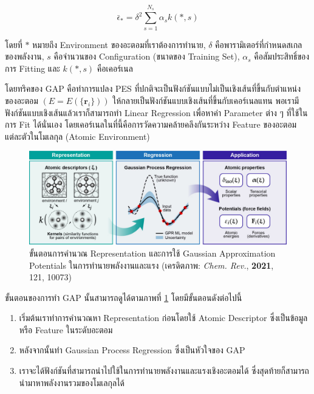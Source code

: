\begin{equation}\label{eq:gap}
    \bar{\epsilon}_{\ast} 
    = 
    \delta^{2} \sum\limits_{s = 1}^{N_s} \alpha_{s} k(\ast,s)
\end{equation}

\noindent โดยที่ $\ast$ หมายถึง Environment ของอะตอมที่เราต้องการทำนาย, $\delta$ คือพารามิเตอร์ที่กำหนดสเกลของพลังงาน, $s$ คือจำนวนของ Configuration (ขนาดของ Training Set), $\alpha_{s}$ คือสัมประสิทธิ์ของการ Fitting และ $k(\ast,s)$ คือเคอร์เนล

โดยทริคของ GAP คือทำการแปลง PES ที่ปกติจะเป็นฟังก์ชันแบบไม่เป็นเชิงเส้นที่ขึ้นกับตำแหน่งของอะตอม $(E = E(\{ \bm{r}_i \}))$ ให้กลายเป็นฟังก์ชันแบบเชิงเส้นที่ขึ้นกับเคอร์เนลแทน พอเรามีฟังก์ชันแบบเชิงเส้นแล้วเราก็สามารถทำ Linear Regression เพื่อหาค่า Parameter ต่าง ๆ ที่ใช้ในการ Fit ได้นั่นเอง โดยเคอร์เนลในที่นี้คือการวัดความคล้ายคลึงกันระหว่าง Feature ของอะตอมแต่ละตัวในโมเลกุล (Atomic Environment)

\begin{figure}[H]
    \centering
    \includegraphics[width=\linewidth]{fig/gap_procedure.jpeg}
    \caption{ขั้นตอนการคำนวณ Representation และการใช้ Gaussian Approximation Potentials ในการทำนายพลังงานและแรง
        (เครดิตภาพ: \textit{Chem. Rev.}, \textbf{2021}, 121, 10073\autocite{deringer2019})}
    \label{fig:gap_procedure}
\end{figure}

ขั้นตอนของการทำ GAP นั้นสามารถดูได้ตามภาพที่ \ref{fig:gap_procedure} โดยมีขั้นตอนดังต่อไปนี้
%
\begin{enumerate}[topsep=0pt,noitemsep]\setlength\itemsep{0.5em}
    \item เริ่มต้นเราทำการคำนวณหา Representation ก่อนโดยใช้ Atomic Descriptor ซึ่งเป็นข้อมูลหรือ Feature ในระดับอะตอม
    
    \item หลังจากนั้นทำ Gaussian Process Regression ซึ่งเป็นหัวใจของ GAP
    
    \item เราจะได้ฟังก์ชันที่สามารถนำไปใช้ในการทำนายพลังงานและแรงเชิงอะตอมได้ ซึ่งสุดท้ายก็สามารถนำมาหาพลังงานรวมของโมเลกุลได้
\end{enumerate}

